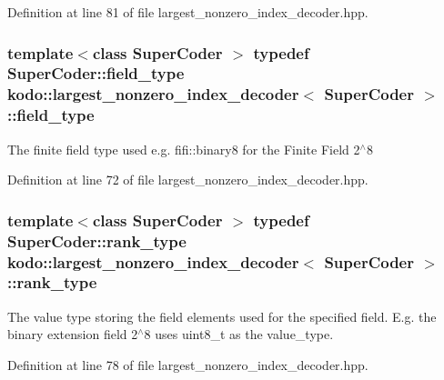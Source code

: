 Definition at line 81 of file largest\-\_\-nonzero\-\_\-index\-\_\-decoder.\-hpp.

\hypertarget{classkodo_1_1largest__nonzero__index__decoder_af1a8cc14d5dfa8a9f5a08b0cd53c392e}{
\subsubsection[{field\-\_\-type}]{\setlength{\rightskip}{0pt plus 5cm}template$<$class Super\-Coder $>$ typedef Super\-Coder\-::field\-\_\-type {\bf kodo\-::largest\-\_\-nonzero\-\_\-index\-\_\-decoder}$<$ Super\-Coder $>$\-::{\bf field\-\_\-type}}}\label{classkodo_1_1largest__nonzero__index__decoder_af1a8cc14d5dfa8a9f5a08b0cd53c392e}




The finite field type used e.\-g. fifi\-::binary8 for the Finite Field 2$^\wedge$8 

Definition at line 72 of file largest\-\_\-nonzero\-\_\-index\-\_\-decoder.\-hpp.

\hypertarget{classkodo_1_1largest__nonzero__index__decoder_a27df8d24f0a91c14f8143d8a88205e7a}{
\subsubsection[{rank\-\_\-type}]{\setlength{\rightskip}{0pt plus 5cm}template$<$class Super\-Coder $>$ typedef Super\-Coder\-::rank\-\_\-type {\bf kodo\-::largest\-\_\-nonzero\-\_\-index\-\_\-decoder}$<$ Super\-Coder $>$\-::{\bf rank\-\_\-type}}}\label{classkodo_1_1largest__nonzero__index__decoder_a27df8d24f0a91c14f8143d8a88205e7a}




The value type storing the field elements used for the specified field. E.\-g. the binary extension field 2$^\wedge$8 uses uint8\-\_\-t as the value\-\_\-type. 

Definition at line 78 of file largest\-\_\-nonzero\-\_\-index\-\_\-decoder.\-hpp.

